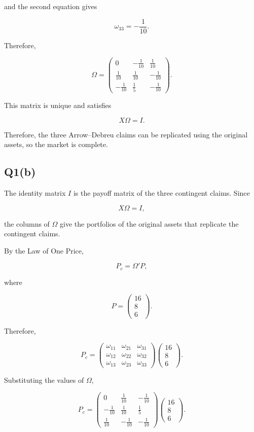 \documentclass{article}
\begin{document}
and the second equation gives

\[
\omega_{33}=-\frac{1}{10}.
\]

Therefore,

\[
\Omega=
\begin{pmatrix}
0 & -\frac{1}{10} & \frac{1}{10}\\
\frac{1}{10} & \frac{1}{10} & -\frac{1}{10}\\
-\frac{1}{10} & \frac{1}{5} & -\frac{1}{10}
\end{pmatrix}.
\]

This matrix is unique and satisfies

\[
X\Omega=I.
\]

Therefore, the three Arrow--Debreu claims can be replicated using the original assets, so the market is complete.

\subsection{Q1(b)}

The identity matrix \(I\) is the payoff matrix of the three contingent claims. Since

\[
X\Omega=I,
\]

the columns of \(\Omega\) give the portfolios of the original assets that replicate the contingent claims.

By the Law of One Price,

\[
P_c=\Omega'P,
\]

where

\[
P=
\begin{pmatrix}
16\\
8\\
6
\end{pmatrix}.
\]

Therefore,

\[
P_c
=
\begin{pmatrix}
\omega_{11} & \omega_{21} & \omega_{31}\\
\omega_{12} & \omega_{22} & \omega_{32}\\
\omega_{13} & \omega_{23} & \omega_{33}
\end{pmatrix}
\begin{pmatrix}
16\\
8\\
6
\end{pmatrix}.
\]

Substituting the values of \(\Omega\),

\[
P_c
=
\begin{pmatrix}
0 & \frac{1}{10} & -\frac{1}{10}\\
-\frac{1}{10} & \frac{1}{10} & \frac{1}{5}\\
\frac{1}{10} & -\frac{1}{10} & -\frac{1}{10}
\end{pmatrix}
\begin{pmatrix}
16\\
8\\
6
\end{pmatrix}.
\]
\end{document}

